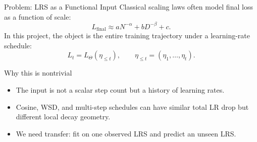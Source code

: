 \documentclass[fontset=fandol,aspectratio=169,10pt]{ctexbeamer}
\newcommand{\lr}{\eta}
\begin{document}
\begin{frame}{Problem: LRS as a Functional Input}
  Classical scaling laws often model final loss as a function of scale:
  \[
    L_{\mathrm{final}} \approx aN^{-\alpha}+bD^{-\beta}+c.
  \]
  In this project, the object is the \alert{entire training trajectory} under a learning-rate schedule:
  \[
    L_t = L_{\Theta}\!\left(\lr_{\le t}\right),
    \qquad
    \lr_{\le t} = (\lr_1,\ldots,\lr_t).
  \]

  \vspace{0.5em}
  \begin{block}{Why this is nontrivial}
    \begin{itemize}
      \item The input is not a scalar step count but a history of learning rates.
      \item Cosine, WSD, and multi-step schedules can have similar total LR drop but different local decay geometry.
      \item We need transfer: fit on one observed LRS and predict an unseen LRS.
    \end{itemize}
  \end{block}
\end{frame}
\end{document}
